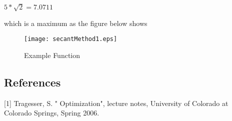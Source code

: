 \documentclass[12pt]{article}
\begin{document}
$5*\sqrt{2} = 7.0711$

which is a maximum as the figure below shows

\begin{figure}
\texttt{[image: secantMethod1.eps]}
\caption{Example Function}
\end{figure}

\subsection{References}

[1] Tragesser, S. " Optimization", lecture notes, University of Colorado at Colorado Springs, Spring 2006.
\end{document}

